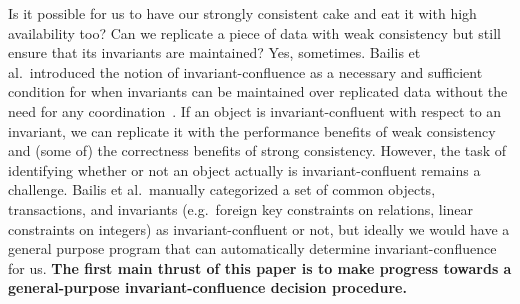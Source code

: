 Is it possible for us to have our strongly consistent cake and eat it with high
availability too? Can we replicate a piece of data with weak consistency but
still ensure that its invariants are maintained? Yes, sometimes. Bailis et al.\
introduced the notion of invariant-confluence as a necessary and sufficient
condition for when invariants can be maintained over replicated data without
the need for any coordination~\cite{bailis2014coordination}. If an object is
invariant-confluent with respect to an invariant, we can replicate it with the
performance benefits of weak consistency and (some of) the correctness benefits
of strong consistency. However, the task of identifying whether or not an
object actually is invariant-confluent remains a challenge. Bailis et al.\
manually categorized a set of common objects, transactions, and invariants
(e.g.\ foreign key constraints on relations, linear constraints on integers) as
invariant-confluent or not, but ideally we would have a general purpose program
that can automatically determine invariant-confluence for us. \textbf{The first
main thrust of this paper is to make progress towards a general-purpose
invariant-confluence decision procedure.}


